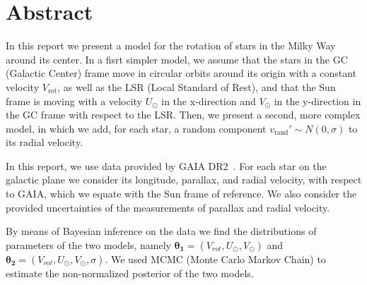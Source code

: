 \section*{Abstract}

In this report we present a model for the rotation of stars in the Milky Way around its center.
In a fisrt simpler model, we assume that the stars in the GC (Galactic Center) frame move in circular orbits around its origin with a constant velocity $V_{\text{rot}}$, as well as the LSR (Local Standard of Rest), and that the Sun frame is moving with a velocity $U_{\odot}$ in the x-direction and $V_{\odot}$ in the y-direction in the GC frame with respect to the LSR. Then, we present a second, more complex model, in which we add, for each star, a random component $v_{\text{rand}}' \sim N(0, \sigma)$ to its radial velocity.



In this report, we use data provided by GAIA DR2~\cite{GAIADR2}.
For each star on the galactic plane we consider its longitude, parallax, and radial velocity, with respect to GAIA, which we equate with the Sun frame of reference.
We also consider the provided uncertainties of the measurements of parallax and radial velocity.

By means of Bayesian inference on the data we find the distributions of parameters of the two models, namely $\mathbf{\theta_1} = (V_{rot}, U_{\odot}, V_{\odot})$ and $\mathbf{\theta_2} = (V_{rot}, U_{\odot}, V_{\odot}, \sigma)$.
We used MCMC (Monte Carlo Markov Chain) to estimate the non-normalized posterior of the two models. 

